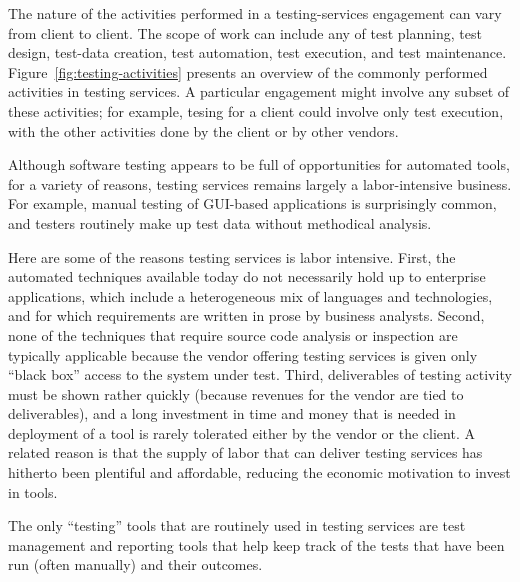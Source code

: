 The nature of the activities performed in a testing-services engagement can vary
from client to client. The scope of work can include any of test planning, test design,
test-data creation, test automation, test execution, and test maintenance. 
Figure~\ref{fig:testing-activities} presents an overview of
the commonly performed activities in testing services. 
A particular engagement might involve any subset of these activities; for example,
tesing for a client could involve only test execution, with the other
activities done by the client or by other vendors.  


Although software testing appears to be full of opportunities for automated tools,
for a variety of reasons, testing services remains largely a labor-intensive
business.  For example, manual testing of GUI-based applications is surprisingly
common, and testers routinely make up test data without methodical analysis.

Here are some of the reasons testing services is labor intensive.  First, the
automated techniques available today do not necessarily hold up to enterprise
applications, which include a heterogeneous mix of languages and technologies,
and for which requirements are written in prose by business analysts.  Second,
none of the techniques that require source code analysis or inspection are
typically applicable because the vendor offering testing services is given only
``black box'' access to the system under test.  Third, deliverables of testing
activity must be shown rather quickly (because revenues for the vendor are tied
to deliverables), and a long investment in time and money that is needed in
deployment of a tool is rarely tolerated either by the vendor or the client.  A
related reason is that the supply of labor that can deliver testing services has
hitherto been plentiful and affordable, reducing the economic motivation to
invest in tools.

The only ``testing'' tools that are routinely used in testing services are test
management and reporting tools that help keep track of the tests that have been
run (often manually) and their outcomes.

